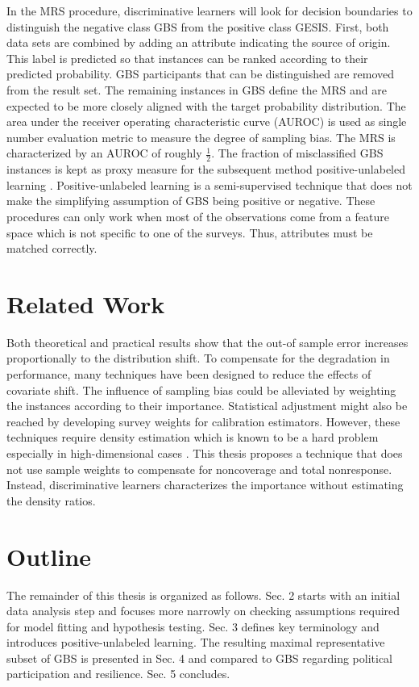 In the MRS procedure, discriminative learners will look for decision boundaries to distinguish the negative class GBS from the positive class GESIS. First, both data sets are combined by adding an attribute indicating the source of origin. This label is predicted so that instances can be ranked according to their predicted probability. GBS participants that can be distinguished are removed from the result set. The remaining instances in GBS define the MRS and are expected to be more closely aligned with the target probability distribution.  The area under the receiver operating characteristic curve (AUROC) is used as single number evaluation metric to measure the degree of sampling bias. The MRS is characterized by an AUROC of roughly \(\frac{1}{2}\). The fraction of misclassified GBS instances is kept as proxy measure for the subsequent method positive-unlabeled learning \cite{denis, claesen}. Positive-unlabeled learning is a semi-supervised technique that does not make the simplifying assumption of GBS being positive or negative. These procedures can only work when most of the observations come from a feature space which is not specific to one of the surveys. Thus, attributes must be matched correctly. 

\section{Related Work}

Both theoretical and practical results show that the out-of sample error increases proportionally to the distribution shift. To compensate for the degradation in performance, many techniques have been designed to reduce the effects of covariate shift. The influence of sampling bias could be alleviated by weighting the instances according to their importance. Statistical adjustment might also be reached by developing survey weights for calibration estimators. However, these techniques require density estimation which is known to be a hard problem especially in high-dimensional cases \cite{jean, shimodaira, brick}. This thesis proposes a technique that does not use sample weights to compensate for noncoverage and total nonresponse. Instead, discriminative learners characterizes the importance without estimating the density ratios.

\section{Outline}

The remainder of this thesis is organized as follows. Sec. 2 starts with an initial data analysis step and focuses more narrowly on checking assumptions required for model fitting and hypothesis testing. Sec. 3 defines key terminology and introduces positive-unlabeled learning. The resulting maximal representative subset of GBS is presented in Sec. 4 and compared to GBS regarding political participation and resilience. Sec. 5 concludes.
